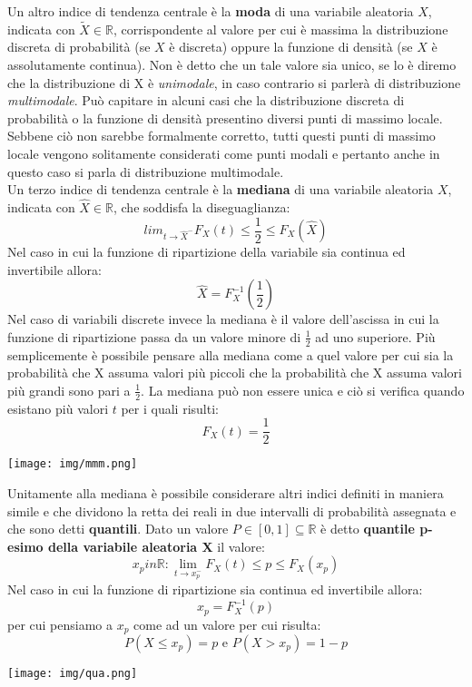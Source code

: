 \documentclass[a4paper,12pt, oneside]{book}
\begin{document}
Un altro indice di tendenza centrale è la \textbf{moda} di una variabile aleatoria $X$, indicata con $\widetilde{X}\in\mathbb{R}$, corrispondente al valore per cui è massima la distribuzione discreta di probabilità (se $X$ è discreta) oppure la funzione di densità (se $X$ è assolutamente continua). Non è detto che un tale valore sia unico, se lo è diremo che la distribuzione di X è \textit{unimodale}, in caso contrario si parlerà di distribuzione \textit{multimodale}. Può capitare in alcuni casi che la distribuzione discreta di probabilità o la funzione
di densità presentino diversi punti di massimo locale.
Sebbene ciò non sarebbe formalmente corretto, tutti questi punti di massimo locale vengono solitamente considerati come punti modali e pertanto anche in questo caso si parla di distribuzione multimodale.\\
Un terzo indice di tendenza centrale è la \textbf{mediana}  di una variabile aleatoria $X$, indicata con $\hat{X}\in\mathbb{R}$, che soddisfa la diseguaglianza:
\[lim_{t\to \hat{X}^-} F_X(t)\leq \frac{1}{2}\leq F_X(\hat{X})\]
Nel caso in cui la funzione di ripartizione della variabile sia continua ed invertibile allora:
\[\hat{X}=F_X^{-1}(\frac{1}{2})\]
Nel caso di variabili discrete invece la mediana è il valore dell'ascissa in cui la funzione di ripartizione passa da un valore minore di $\frac{1}{2}$ ad uno superiore. Più semplicemente è possibile pensare alla mediana come a quel valore per cui sia la probabilità che X assuma valori più piccoli che la probabilità che X assuma valori più grandi sono pari a $\frac{1}{2}$. La mediana può non essere unica e ciò si verifica quando esistano più valori $t$ per i quali risulti:
\[F_X(t)=\frac{1}{2}\]
\begin{center}
\texttt{[image: img/mmm.png]}
\end{center}
Unitamente alla mediana è possibile considerare altri indici definiti in maniera simile e che dividono la retta dei reali in due intervalli di probabilità assegnata e che sono detti \textbf{quantili}. Dato un valore $P\in[0,1]\subseteq\mathbb{R}$ è detto \textbf{quantile p-esimo della variabile aleatoria X} il valore:
\[x_p in\mathbb{R}:\lim_{t\to x_p^{-}}F_X(t)\leq p\leq F_X(x_p)\]
Nel caso in cui la funzione di ripartizione sia continua ed invertibile allora:
\[x_p=F_X^{-1}(p)\]
per cui pensiamo a $x_p$ come ad un valore per cui risulta:
\[P(X\leq x_p)=p\mbox{ e } P(X>x_p)=1-p\]
\begin{center}
\texttt{[image: img/qua.png]}
\end{center}
\end{document}
